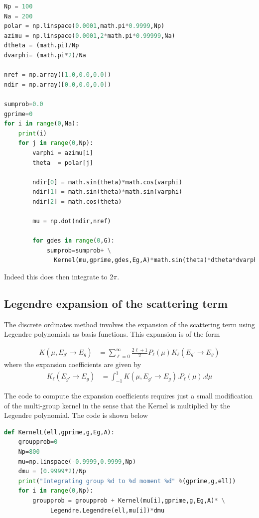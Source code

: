 \documentclass[11pt,letterpaper,titlepage]{article}
\numberwithin{equation}{section}
\begin{document}
\begin{appendices}
\begin{lstlisting}[language=python]
Np = 100
Na = 200
polar = np.linspace(0.0001,math.pi*0.9999,Np)
azimu = np.linspace(0.0001,2*math.pi*0.99999,Na)
dtheta = (math.pi)/Np
dvarphi= (math.pi*2)/Na

nref = np.array([1.0,0.0,0.0])
ndir = np.array([0.0,0.0,0.0])

sumprob=0.0
gprime=0
for i in range(0,Na):
    print(i)
    for j in range(0,Np):
        varphi = azimu[i]
        theta  = polar[j]
        
        ndir[0] = math.sin(theta)*math.cos(varphi)
        ndir[1] = math.sin(theta)*math.sin(varphi)
        ndir[2] = math.cos(theta)
        
        mu = np.dot(ndir,nref)
        
        for gdes in range(0,G):
            sumprob=sumprob+ \
              Kernel(mu,gprime,gdes,Eg,A)*math.sin(theta)*dtheta*dvarphi
\end{lstlisting}

Indeed this does then integrate to $2\pi$.

\newpage
\subsection{Legendre expansion of the scattering term}
The discrete ordinates method involves the expansion of the scattering term using Legendre polynomials as basis functions. This expansion is of the form

\begin{align*}
K(\mu,E_{g'} {\to} E_g) &= \sum_{\ell=0}^\infty \frac{2\ell+1}{2} P_\ell (\mu) K_\ell (E_{g'} {\to }E_g)
\end{align*}
where the expansion coefficients are given by
\begin{align*}
K_\ell(E_{g'} {\to} E_g) &= \int_{-1}^1 K(\mu,E_{g'} {\to} E_g).P_\ell (\mu).d\mu
\end{align*}

The code to compute the expansion coefficients requires just a small modification of the multi-group kernel in the sense that the Kernel is multiplied by the Legendre polynomial. The code is shown below

\begin{lstlisting}[language=python]
def KernelL(ell,gprime,g,Eg,A):
    groupprob=0
    Np=800
    mu=np.linspace(-0.9999,0.9999,Np)
    dmu = (0.9999*2)/Np
    print("Integrating group %d to %d moment %d" %(gprime,g,ell))
    for i in range(0,Np):
        groupprob = groupprob + Kernel(mu[i],gprime,g,Eg,A)* \
             Legendre.Legendre(ell,mu[i])*dmu
    

\end{lstlisting}
\end{appendices}
\end{document}
